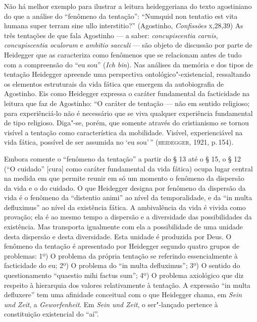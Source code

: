 Não há melhor exemplo para ilustrar a leitura heideggeriana do
texto agostiniano do que a análise do “fenômeno da tentação”:
“Numquid non tentatio est vita humana super terram sine ullo
interstitio?” (Agostinho, \emph{Confissões} \textsc{x},28,39) As três
tentações de que fala Agostinho --- a saber:
\emph{concupiscentia carnis, concupiscentia oculorum} e
\emph{ambitio saeculi} --- são objeto de discussão por parte de
Heidegger que as caracteriza como fenômenos que se relacionam
antes de tudo com a compreensão do “eu sou” (\emph{Ich bin}).
Nas análises da memória e dos tipos de tentação Heidegger
apreende uma perspectiva ontológico"-existencial, ressaltando os
elementos estruturais da vida fática que emergem da
autobiografia de Agostinho. Eis como Heidegger expressa o
caráter fundamental da facticidade na leitura que faz de
Agostinho: “O caráter de tentação --- não em sentido religioso;
para experiênciá-lo não é necessário que se viva qualquer
experiência fundamental de tipo religioso. Diga"-se, porém, que
somente através do cristianismo se tornou visível a tentação
como característica da mobilidade. Visível, experienciável na
vida fática, possível de ser assumida no ‘eu sou'\,”
(\textsc{heidegger}, 1921, p.\,154). 

Embora comente o “fenômeno da tentação” a partir do § 13 até o §
15, o § 12 (“O cuidado'' [cura] como caráter fundamental da vida
fática) ocupa lugar central na medida em que permite reunir em
só um momento o fenômeno da dispersão da vida e o do cuidado. O que
Heidegger designa por fenômeno da dispersão da vida é o fenômeno
da “distentio animi” ao nível da temporalidade, e da “in multa
defluximus” ao nível da existência fática. A ambivalência da
vida é vivida como provação; ela é ao mesmo tempo a dispersão e
a diversidade das possibilidades da existência. Mas transporta
igualmente com ela a possibilidade de uma unidade desta
dispersão e desta diversidade. Esta unidade é produzida por
Deus. O fenômeno da tentação é apresentado por Heidegger segundo
quatro grupos de problemas: 1º) O problema da própria tentação
se referindo essencialmente à facticidade do eu; 2º) O problema
do “in multa defluximus”; 3º) O sentido do questionamento
“quaestio mihi factus sum”; 4º) O problema axiológico que diz
respeito à hierarquia dos valores relativamente à tentação. A
expressão “in multa defluxere” tem uma afinidade conceitual com
o que Heidegger chama, em \emph{Sein und Zeit}, a
\emph{Geworfenheit}. Em \emph{Sein und Zeit}, o ser"-lançado
pertence à constituição existencial do “aí”. 

